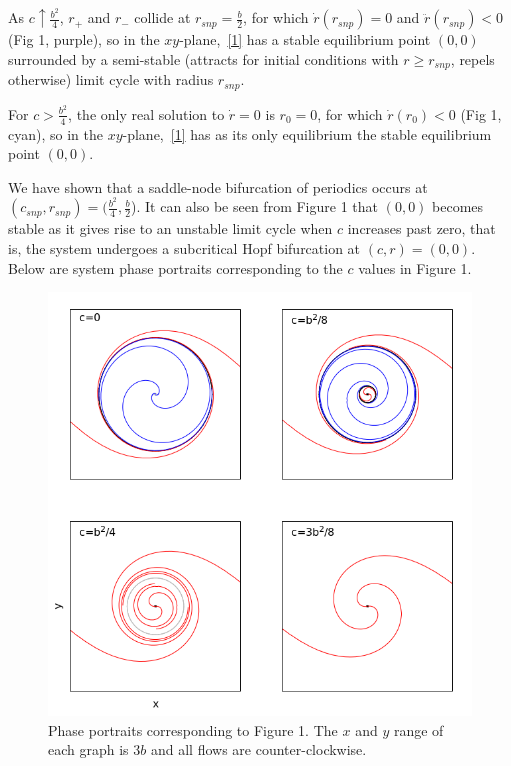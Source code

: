 \documentclass[a4paper,11pt]{article}
\begin{document}
\noindent
As $c\uparrow\frac{b^2}4$, $r_+$ and $r_-$ collide at $r_{snp}=\frac{b}2$, for which $\dot{r}(r_{snp})=0$ and $\ddot{r}(r_{snp})<0$ (Fig 1, purple), so in the $xy$-plane,~\eqref{1} has a stable equilibrium point $(0,0)$ surrounded by a semi-stable (attracts for initial conditions with $r\geq r_{snp}$, repels otherwise) limit cycle with radius $r_{snp}$.\vspace{3mm}

\noindent
For $c>\frac{b^2}4$, the only real solution to $\dot{r}=0$ is $r_0=0$, for which $\dot{r}(r_0)<0$ (Fig 1, cyan), so in the $xy$-plane,~\eqref{1} has as its only equilibrium the stable equilibrium point $(0,0)$.\vspace{3mm}

\noindent
We have shown that a saddle-node bifurcation of periodics occurs at $(c_{snp},r_{snp})=(\frac{b^2}{4},\frac{b}2$). It can also be seen from Figure 1 that $(0,0)$ becomes stable as it gives rise to an unstable limit cycle when $c$ increases past zero, that is, the system undergoes a subcritical Hopf bifurcation at $(c,r)=(0,0)$. Below are system phase portraits corresponding to the $c$ values in Figure 1.\vspace{3mm}

\begin{center}
\begin{figure}[H]
  \centering
    \includegraphics[scale=.5]{gnuplot/fig2.png}
 \caption{Phase portraits corresponding to Figure 1. The $x$ and $y$ range of each graph is $3b$ and all flows are counter-clockwise.}
\label{fig2}
\end{figure}
\end{center}
\end{document}

